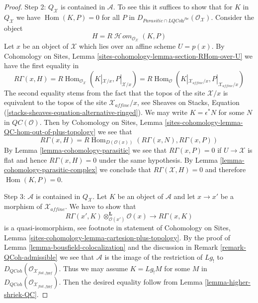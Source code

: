 \documentclass[10pt,a4paper]{amsart}
\theoremstyle{plain}
\theoremstyle{definition}
\theoremstyle{remark}
\numberwithin{equation}{subsection}
\def\Hom{\mathop{\mathrm{Hom}}\nolimits}
\def\SheafHom{\mathop{\mathcal{H}\!\mathit{om}}\nolimits}
\def\QCoh{\mathit{QCoh}}
\begin{document}
\begin{proof}
\medskip\noindent
Step 2: $Q_\mathcal{X}$ is contained in $\mathcal{A}$.
To see this it suffices to show that for $K$ in $Q_\mathcal{X}$
we have $\Hom(K, P) = 0$ for all $P$ in
$D_{\textit{Parasitic} \cap \textit{LQCoh}^{fbc}}(\mathcal{O}_\mathcal{X})$.
Consider the object
$$
H = R\SheafHom_{\mathcal{O}_\mathcal{X}}(K, P)
$$
Let $x$ be an object of $\mathcal{X}$ which lies over an affine scheme
$U = p(x)$. By Cohomology on Sites, Lemma
\ref{sites-cohomology-lemma-section-RHom-over-U} we have
the first equality in
$$
R\Gamma(x, H) =
R\Hom_{\mathcal{O}_\mathcal{X}}(K|_{\mathcal{X}/x}, P|_{\mathcal{X}/x}) =
R\Hom_{\mathcal{O}}(K|_{\mathcal{X}_{affine}/x}, P|_{\mathcal{X}_{affine}/x})
$$
The second equality stems from the fact that the topos of the site
$\mathcal{X}/x$ is equivalent to the topos of the site
$\mathcal{X}_{affine}/x$, see Sheaves on Stacks, Equation
(\ref{stacks-sheaves-equation-alternative-ringed}).
We may write $K = \epsilon^*N$ for some $N$ in $\mathit{QC}(\mathcal{O})$.
Then by Cohomology on Sites, Lemma
\ref{sites-cohomology-lemma-QC-hom-out-of-plus-topology} we see
that
$$
R\Gamma(x, H) =
R\Hom_{D(\mathcal{O}(x))}(R\Gamma(x, N), R\Gamma(x, P))
$$
By Lemma \ref{lemma-cohomology-parasitic} we see that $R\Gamma(x, P) = 0$
if $U \to \mathcal{X}$ is flat and hence $R\Gamma(x, H) = 0$ under the same
hypothesis. By Lemma \ref{lemma-cohomology-parasitic-complex} we conclude that
$R\Gamma(\mathcal{X}, H) = 0$ and therefore $\Hom(K, P) = 0$.

\medskip\noindent
Step 3: $\mathcal{A}$ is contained in $Q_\mathcal{X}$.
Let $K$ be an object of $\mathcal{A}$ and let $x \to x'$
be a morphism of $\mathcal{X}_{affine}$. We have to show that
$$
R\Gamma(x', K) \otimes_{\mathcal{O}(x')}^\mathbf{L} \mathcal{O}(x)
\longrightarrow
R\Gamma(x, K)
$$
is a quasi-isomorphism, see footnote in statement of Cohomology on Sites,
Lemma \ref{sites-cohomology-lemma-cartesion-plus-topology}.
By the proof of Lemma \ref{lemma-bousfield-colocalization}
and the discussion in Remark \ref{remark-QCoh-admissible}
we see that $\mathcal{A}$ is the image of the restriction
of $Lg_!$ to $D_\QCoh(\mathcal{O}_{\mathcal{X}_{flat, fppf}})$.
Thus we may assume $K = Lg_!M$ for some $M$ in
$D_\QCoh(\mathcal{O}_{\mathcal{X}_{flat, fppf}})$.
Then the desired equality follow from Lemma \ref{lemma-higher-shriek-QC}.
\end{proof}
\end{document}
